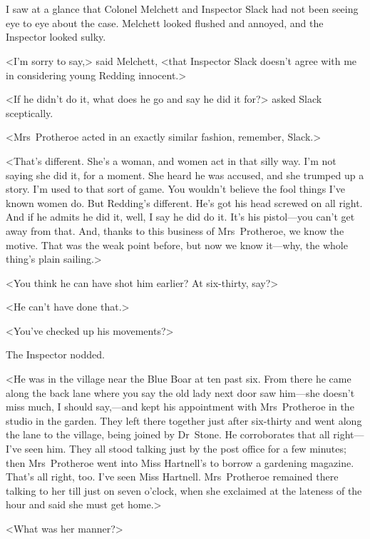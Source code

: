 \chapter[Chapter  \thechapter]{}


\lettrine{I}{} saw at a glance that Colonel Melchett and Inspector Slack had not been seeing eye to eye about the case. Melchett looked flushed and annoyed, and the Inspector looked sulky.

\zz
<I'm sorry to say,> said Melchett, <that Inspector Slack doesn't agree with me in considering young Redding innocent.>

<If he didn't do it, what does he go and say he did it for?> asked Slack sceptically.

<Mrs~Protheroe acted in an exactly similar fashion, remember, Slack.>

<That's different. She's a woman, and women act in that silly way. I'm not saying she did it, for a moment. She heard he was accused, and she trumped up a story. I'm used to that sort of game. You wouldn't believe the fool things I've known women do. But Redding's different. He's got his head screwed on all right. And if he admits he did it, well, I say he did do it. It's his pistol—you can't get away from that. And, thanks to this business of Mrs~Protheroe, we know the motive. That was the weak point before, but now we know it—why, the whole thing's plain sailing.>

<You think he can have shot him earlier? At six-thirty, say?>

<He can't have done that.>

<You've checked up his movements?>

The Inspector nodded.

<He was in the village near the Blue Boar at ten past six. From there he came along the back lane where you say the old lady next door saw him—she doesn't miss much, I should say,—and kept his appointment with Mrs~Protheroe in the studio in the garden. They left there together just after six-thirty and went along the lane to the village, being joined by Dr~Stone. He corroborates that all right—I've seen him. They all stood talking just by the post office for a few minutes; then Mrs~Protheroe went into Miss Hartnell's to borrow a gardening magazine. That's all right, too. I've seen Miss Hartnell. Mrs~Protheroe remained there talking to her till just on seven o'clock, when she exclaimed at the lateness of the hour and said she must get home.>

<What was her manner?>

